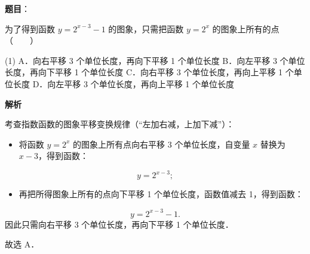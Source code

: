 \begin{answer}

\textbf{题目}：

为了得到函数 $y = 2^{x-3} - 1$ 的图象，只需把函数 $y = 2^x$ 的图象上所有的点\mbox{（　　）}

\begin{gkopts}(1)
\task A．向右平移 3 个单位长度，再向下平移 1 个单位长度
\task B．向左平移 3 个单位长度，再向下平移 1 个单位长度
\task C．向右平移 3 个单位长度，再向上平移 1 个单位长度
\task D．向左平移 3 个单位长度，再向上平移 1 个单位长度
\end{gkopts}

\textbf{解析}

考查指数函数的图象平移变换规律（“左加右减，上加下减”）：
\begin{itemize}
\item 将函数 $y = 2^x$ 的图象上所有点向右平移 3 个单位长度，自变量 $x$ 替换为 $x - 3$，得到函数：
\end{itemize}
\nopagebreak[4]
\[
y = 2^{x-3};
\]
\begin{itemize}
\item 再把所得图象上所有的点向下平移 1 个单位长度，函数值减去 1，得到函数：
\end{itemize}
\nopagebreak[4]
\[
y = 2^{x-3} - 1.
\]
因此只需向右平移 3 个单位长度，再向下平移 1 个单位长度．

故选 A．


\end{answer}
